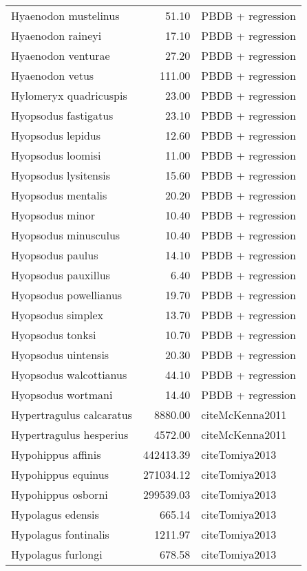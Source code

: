 \begin{table}[ht]
\begin{tabular}{lrl}
  Hyaenodon mustelinus & 51.10 & PBDB + regression \\ 
  Hyaenodon raineyi & 17.10 & PBDB + regression \\ 
  Hyaenodon venturae & 27.20 & PBDB + regression \\ 
  Hyaenodon vetus & 111.00 & PBDB + regression \\ 
  Hylomeryx quadricuspis & 23.00 & PBDB + regression \\ 
  Hyopsodus fastigatus & 23.10 & PBDB + regression \\ 
  Hyopsodus lepidus & 12.60 & PBDB + regression \\ 
  Hyopsodus loomisi & 11.00 & PBDB + regression \\ 
  Hyopsodus lysitensis & 15.60 & PBDB + regression \\ 
  Hyopsodus mentalis & 20.20 & PBDB + regression \\ 
  Hyopsodus minor & 10.40 & PBDB + regression \\ 
  Hyopsodus minusculus & 10.40 & PBDB + regression \\ 
  Hyopsodus paulus & 14.10 & PBDB + regression \\ 
  Hyopsodus pauxillus & 6.40 & PBDB + regression \\ 
  Hyopsodus powellianus & 19.70 & PBDB + regression \\ 
  Hyopsodus simplex & 13.70 & PBDB + regression \\ 
  Hyopsodus tonksi & 10.70 & PBDB + regression \\ 
  Hyopsodus uintensis & 20.30 & PBDB + regression \\ 
  Hyopsodus walcottianus & 44.10 & PBDB + regression \\ 
  Hyopsodus wortmani & 14.40 & PBDB + regression \\ 
  Hypertragulus calcaratus & 8880.00 & cite{McKenna2011} \\ 
  Hypertragulus hesperius & 4572.00 & cite{McKenna2011} \\ 
  Hypohippus affinis & 442413.39 & cite{Tomiya2013} \\ 
  Hypohippus equinus & 271034.12 & cite{Tomiya2013} \\ 
  Hypohippus osborni & 299539.03 & cite{Tomiya2013} \\ 
  Hypolagus edensis & 665.14 & cite{Tomiya2013} \\ 
  Hypolagus fontinalis & 1211.97 & cite{Tomiya2013} \\ 
  Hypolagus furlongi & 678.58 & cite{Tomiya2013} \\ 

\end{tabular}
\end{table}
